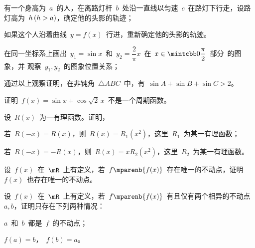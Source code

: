 \begin{exercise*}
\item\relax
\begin{exlist}
  \item 有一个身高为~$a$~的人，在离路灯杆~$b$~处沿一直线以匀速~$c$~在路灯下行走，设路灯高为~$h\mcond{h>a}$，确定他的头影的轨迹；
  \item 如果这个人沿着曲线~$y=f(x)$~行进，重新确定他的头影的轨迹。
\end{exlist}
\item\relax
\begin{exlist}
  \item 在同一坐标系上画出~$y_1=\sin x$~和~$y_2=\dfrac2\pi x$~在~$x\in\mintcbb 0{\dfrac\pi2}$~部分~的图象，并
        观察~$y_1,y_2$~的图象位置关系；
  \item 通过以上观察证明，在非钝角~$\triangle ABC$~中，有~$\sin A+\sin B+\sin C>2$。
\end{exlist}
\item 证明~$f(x)=\sin x+\cos\sqrt 2\,x$~不是一个周期函数。
\item 设~$R(x)$~为一有理函数。证明，
\begin{exlist}
  \item 若~$R(-x)=R(x)$，则~$R(x)=R_1(x^2)$，这里~$R_1$~为某一有理函数；
  \item 若~$R(-x)=-R(x)$，则~$R(x)=x R_2(x^2)$，这里~$R_2$~为某一有理函数。
\end{exlist}
\item 设~$f(x)$~在~$\mR$~上有定义，若~$f\mparenb{f(x)}$~存在唯一的不动点，证明~$f(x)$~也存在唯一的不动点。
\item 设~$f(x)$~在~$\mR$~上有定义，若~$f\mparenb{f(x)}$~有且仅有两个相异的不动点~$a,b$，证明只存在下列两种情况：
\begin{exlistcols}
  \item $a$~和~$b$~都是~$f$~的不动点；
  \item $f(a)=b$，~$f(b)=a$。
\end{exlistcols}
\end{exercise*}




\endinput
